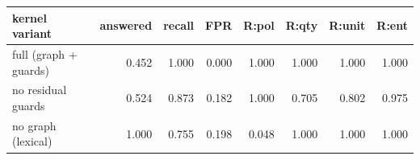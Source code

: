 \begin{tabular}{lrrrrrrr}
\toprule
kernel variant & answered & recall & FPR & R:pol & R:qty & R:unit & R:ent \\
\midrule
full (graph + guards) & 0.452 & 1.000 & 0.000 & 1.000 & 1.000 & 1.000 & 1.000 \\
no residual guards & 0.524 & 0.873 & 0.182 & 1.000 & 0.705 & 0.802 & 0.975 \\
no graph (lexical) & 1.000 & 0.755 & 0.198 & 0.048 & 1.000 & 1.000 & 1.000 \\
\bottomrule
\end{tabular}
